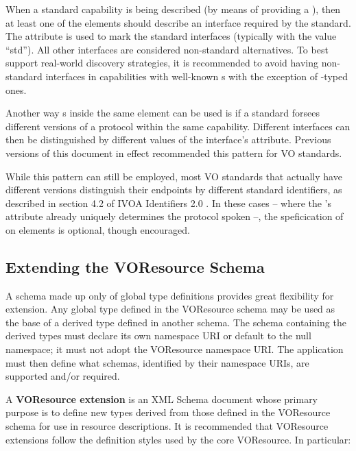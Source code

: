 \documentclass[11pt,a4paper]{ivoa}
\begin{document}
When a standard capability is being described (by means of providing a
), then at least one of the
 elements should describe an interface required
by the standard.  The  attribute is used to mark the
standard interfaces (typically with the value ``std'').
All other interfaces are considered non-standard
alternatives.  To best support real-world discovery strategies, it is
recommended to avoid having non-standard interfaces in capabilities
with well-known s with the exception of
-typed ones.


Another way s inside the same
 element can be used is if a standard forsees
different versions of a protocol within the same capability.  Different
interfaces can then be distinguished by different values of the
interface's  attribute.  Previous versions of this
document in effect recommended this pattern for VO standards.

While this pattern can still be employed, most VO standards that
actually have different versions distinguish their endpoints by
different standard identifiers, as described in section 4.2 of IVOA
Identifiers 2.0 \citep{std:identifiers2}.  In these cases -- where the
's  attribute already uniquely
determines the protocol spoken --, the speficication of 
on  elements is optional, though encouraged.

\subsection{Extending the VOResource Schema}

\label{sect:extending}

A schema made up only of global type definitions provides great
flexibility for extension.  Any global type defined in the VOResource
schema may be used as the base of a derived type defined in another
schema.  The schema containing the derived types must declare its own
namespace URI or default to the null namespace; it must not adopt the
VOResource namespace URI.  The application must then define what
schemas, identified by their namespace URIs, are supported and/or
required.  



A \textbf{VOResource extension} is an XML Schema document whose primary
purpose is to define new types derived from those defined in the
VOResource schema for use in resource descriptions.  It is recommended
that VOResource extensions follow the definition styles used by the core
VOResource.  In particular: 
\end{document}
